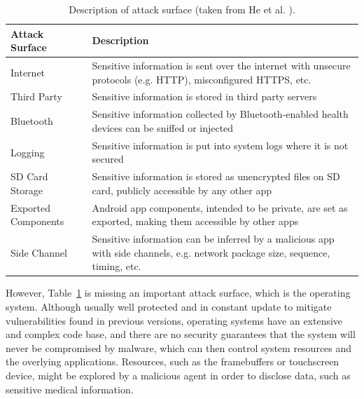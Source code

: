 \begin{table}[t]
	\caption {Description of attack surface (taken from He et al. \cite{he2014security}).}
	\label{tab:attacksurfaces}
	\begin{tabular}{|>{\raggedright}p{2cm}|>{\raggedright\arraybackslash}p{10cm}|}
		\hline
		\textbf{Attack Surface}      & \textbf{Description}                                                                                                                    \\ \hline
		Internet            & Sensitive information is sent over the internet with unsecure protocols (e.g. HTTP), misconfigured HTTPS, etc.                 \\ \hline
		Third Party         & Sensitive information is stored in third party servers                                                                         \\ \hline
		Bluetooth           & Sensitive information collected by Bluetooth-enabled health devices can be sniffed or injected                                 \\ \hline
		Logging             & Sensitive information is put into system logs where it is not secured                                                          \\ \hline
		SD Card Storage     & Sensitive information is stored as unencrypted files on SD card, publicly accessible by any other app                          \\ \hline
		Exported Components &  Android app components, intended to be private, are set as exported, making them accessible by other apps                     \\ \hline
		Side Channel        & Sensitive information can be inferred by a malicious app with side channels, e.g. network package size, sequence, timing, etc. \\ \hline
	\end{tabular}
\end{table}

However, Table~\ref{tab:attacksurfaces} is missing an important attack surface, which is the operating system. Although usually well protected and in constant update to mitigate vulnerabilities found in previous versions, operating systems have an extensive and complex code base, and there are no security guarantees that the system will never be compromised by malware, which can then control system resources and the overlying applications. Resources, such as the framebuffers or touchscreen device, might be explored by a malicious agent in order to disclose data, such as sensitive medical information.

